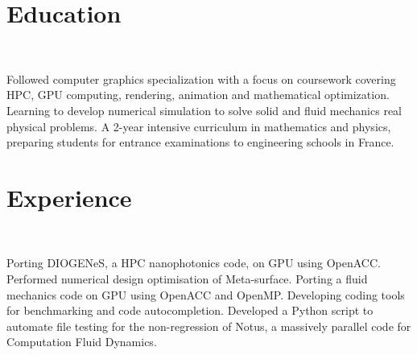 \documentclass[letterpaper]{twentysecondcv} %
\begin{document}
\section{Education}
\\
\begin{twenty} %
	{Followed computer graphics specialization with a focus on coursework covering HPC, GPU computing, rendering, animation and mathematical optimization. }
	{Learning to develop numerical simulation to solve solid and fluid mechanics real physical problems.}
	{A 2-year intensive curriculum in mathematics and physics, preparing students for entrance examinations to engineering schools in France.}
\end{twenty}


\section{Experience}
\\
\begin{twenty} %
	{Porting DIOGENeS, a HPC nanophotonics code, on GPU using OpenACC.
	Performed numerical design optimisation of Meta-surface.}
	{Porting a fluid mechanics code on GPU using OpenACC and OpenMP. Developing coding tools for benchmarking and code autocompletion.}
	{Developed a Python script to automate file testing for the non-regression of Notus, a massively parallel code for Computation Fluid Dynamics.}
\end{twenty}
\end{document}
